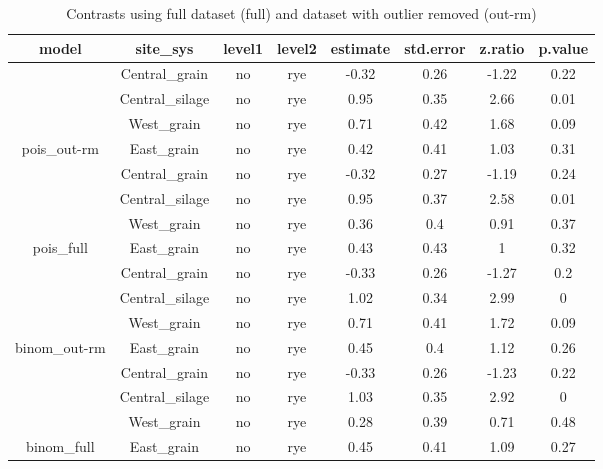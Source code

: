 \documentclass[]{article}
\begin{document}
\begin{table}[H]

\caption{\label{tab:contrasts}Contrasts using full dataset (full) and dataset with outlier removed (out-rm)}
\centering
\begin{tabular}[t]{cccccccc}
\toprule
model & site\_sys & level1 & level2 & estimate & std.error & z.ratio & p.value\\
\midrule
\rowcolor{gray!6}   & Central\_grain & no & rye & -0.32 & 0.26 & -1.22 & 0.22\\

 & Central\_silage & no & rye & 0.95 & 0.35 & 2.66 & 0.01\\

\rowcolor{gray!6}   & West\_grain & no & rye & 0.71 & 0.42 & 1.68 & 0.09\\

\multirow{-4}{*}{\centering\arraybackslash pois\_out-rm} & East\_grain & no & rye & 0.42 & 0.41 & 1.03 & 0.31\\
\cmidrule{1-8}
\rowcolor{gray!6}   & Central\_grain & no & rye & -0.32 & 0.27 & -1.19 & 0.24\\

 & Central\_silage & no & rye & 0.95 & 0.37 & 2.58 & 0.01\\

\rowcolor{gray!6}   & West\_grain & no & rye & 0.36 & 0.4 & 0.91 & 0.37\\

\multirow{-4}{*}{\centering\arraybackslash pois\_full} & East\_grain & no & rye & 0.43 & 0.43 & 1 & 0.32\\
\cmidrule{1-8}
\rowcolor{gray!6}   & Central\_grain & no & rye & -0.33 & 0.26 & -1.27 & 0.2\\

 & Central\_silage & no & rye & 1.02 & 0.34 & 2.99 & 0\\

\rowcolor{gray!6}   & West\_grain & no & rye & 0.71 & 0.41 & 1.72 & 0.09\\

\multirow{-4}{*}{\centering\arraybackslash binom\_out-rm} & East\_grain & no & rye & 0.45 & 0.4 & 1.12 & 0.26\\
\cmidrule{1-8}
\rowcolor{gray!6}   & Central\_grain & no & rye & -0.33 & 0.26 & -1.23 & 0.22\\

 & Central\_silage & no & rye & 1.03 & 0.35 & 2.92 & 0\\

\rowcolor{gray!6}   & West\_grain & no & rye & 0.28 & 0.39 & 0.71 & 0.48\\

\multirow{-4}{*}{\centering\arraybackslash binom\_full} & East\_grain & no & rye & 0.45 & 0.41 & 1.09 & 0.27\\
\bottomrule
\end{tabular}
\end{table}
\end{document}
